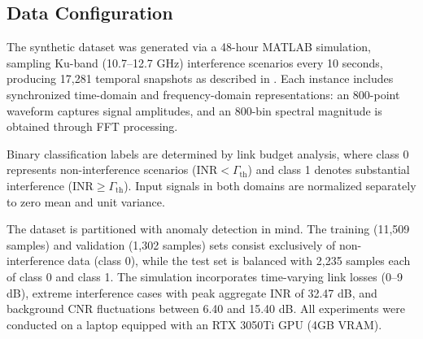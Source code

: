 \documentclass[conference]{IEEEtran}
\begin{document}


\subsection{Data Configuration}

The synthetic dataset was generated via a 48-hour MATLAB simulation, sampling Ku-band (10.7–12.7 GHz) interference scenarios every 10 seconds, producing 17,281 temporal snapshots as described in \cite{saifaldawlaGenAIBasedModelsNGSO2024}. Each instance includes synchronized time-domain and frequency-domain representations: an 800-point waveform captures signal amplitudes, and an 800-bin spectral magnitude is obtained through FFT processing.

Binary classification labels are determined by link budget analysis, where class 0 represents non-interference scenarios ($\text{INR} < \Gamma_{\text{th}}$) and class 1 denotes substantial interference ($\text{INR} \geq \Gamma_{\text{th}}$). Input signals in both domains are normalized separately to zero mean and unit variance.

The dataset is partitioned with anomaly detection in mind. The training (11,509 samples) and validation (1,302 samples) sets consist exclusively of non-interference data (class 0), while the test set is balanced with 2,235 samples each of class 0 and class 1. The simulation incorporates time-varying link losses (0–9 dB), extreme interference cases with peak aggregate INR of 32.47 dB, and background CNR fluctuations between 6.40 and 15.40 dB. All experiments were conducted on a laptop equipped with an RTX 3050Ti GPU (4GB VRAM).
\end{document}
